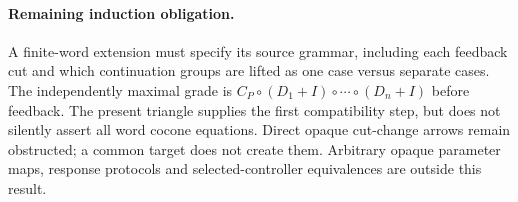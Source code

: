 \documentclass[11pt]{article}\usepackage{amsmath,amssymb,amsthm,geometry}\geometry{margin=1in}\newtheorem{theorem}{Theorem}
\begin{document}
\paragraph{Remaining induction obligation.} A finite-word extension must specify its source grammar, including each feedback cut and which continuation groups are lifted as one case versus separate cases. The independently maximal grade is $C_P\circ(D_1+I)\circ\cdots\circ(D_n+I)$ before feedback. The present triangle supplies the first compatibility step, but does not silently assert all word cocone equations. Direct opaque cut-change arrows remain obstructed; a common target does not create them. Arbitrary opaque parameter maps, response protocols and selected-controller equivalences are outside this result.
\end{document}

